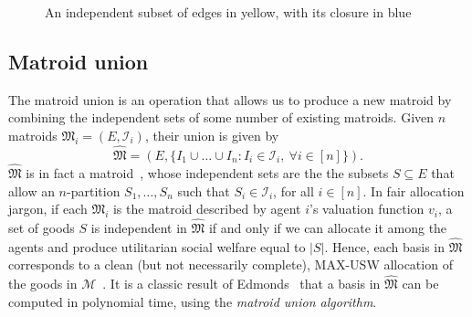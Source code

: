 \begin{figure}
  \centering
  \caption{An independent subset of edges in yellow, with its closure in blue}
  \label{fig:ex-graph-closure}
\end{figure}

\subsection{Matroid union}
The matroid union is an operation that allows us to produce a new matroid by combining the independent sets of some number of existing matroids. Given $n$ matroids $\mathfrak{M}_i = (E, \mathcal{I}_i)$, their union is given by $$\widehat{\mathfrak{M}} = (E, \{ I_1\cup\ldots\cup I_n : I_i\in\mathcal{I}_i,\ \forall i\in[n] \}).$$ $\widehat{\mathfrak{M}}$ is in fact a matroid~\cite[Ch. 42]{schrijver-2003}, whose independent sets are the the subsets $S\subseteq E$ that allow an $n$-partition $S_1,\ldots,S_n$ such that $S_i\in\mathcal{I}_i$, for all $i\in[n]$. In fair allocation jargon, if each $\mathfrak{M}_i$ is the matroid described by agent $i$'s valuation function $v_i$, a set of goods $S$ is independent in $\widehat{\mathfrak{M}}$ if and only if we can allocate it among the agents and produce utilitarian social welfare equal to $|S|$. Hence, each basis in $\widehat{\mathfrak{M}}$ corresponds to a clean (but not necessarily complete), MAX-USW allocation of the goods in $\mathcal{M}$~\cite{barman2021existence}. It is a classic result of Edmonds~\cite{Edmonds2009} that a basis in $\widehat{\mathfrak{M}}$ can be computed in polynomial time, using the \textit{matroid union algorithm}.




